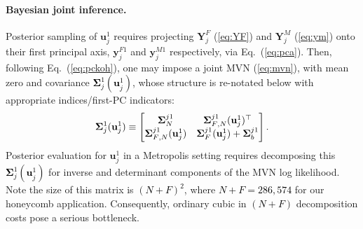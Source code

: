 \documentclass[12pt]{article}
\newcommand{\blunew}[1]{\textcolor{black}{#1}} %
\begin{document}
\paragraph{Bayesian joint inference.} Posterior sampling of $\mathbf{u}^1_j$
requires projecting $\mathbf{Y}_j^F$ (\ref{eq:YF}) and $\mathbf{Y}_j^M$
(\ref{eq:ym}) onto their first principal axis, $\mathbf{y}^{F1}_j$ and
$\mathbf{y}^{M1}_j$ respectively, via Eq.~(\ref{eq:pca}). Then, following
Eq.~(\ref{eq:pckoh}), one may impose a joint MVN (\ref{eq:mvn}), with mean
zero and covariance \blunew{$\mathbf{\Sigma}_j^1(\mathbf{u}^1_j)$}, whose structure is
re-notated below with appropriate indices/first-PC indicators:
\blunew{
\begin{align}
\mathbf{\Sigma}_j^1(\mathbf{u}^1_j)
\equiv \begin{bmatrix} \mathbf{\Sigma}^{j1}_{N}& 
\mathbf{\Sigma}^{j1}_{\blunew{F}, N}(\mathbf{u}^1_j)^\top\\ 
\mathbf{\Sigma}^{j1}_{\blunew{F}, N}(\mathbf{u}^1_j) &
\mathbf{\Sigma}^{j1}_{\blunew{F}}(\mathbf{u}^1_j)  + \mathbf{\Sigma}^{j1}_{b} \end{bmatrix}.    
\label{eq:Sigma}
\end{align}}
Posterior evaluation for $\mathbf{u}^1_j$ in a Metropolis setting
requires decomposing this \blunew{$\mathbf{\Sigma}_j^1(\mathbf{u}^1_j)$} for inverse and
determinant components of the MVN log likelihood.  Note the size of this
matrix is \blunew{$(N
+ F)^2$}, where \blunew{$N + F = 286,574$}  for our honeycomb application.
Consequently, ordinary cubic in \blunew{$(N + F)$} decomposition costs pose a
serious bottleneck.  
\end{document}
